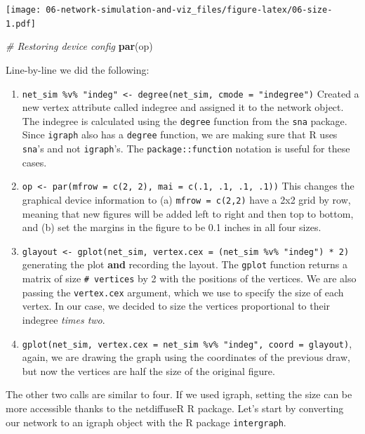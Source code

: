 \documentclass[]{book}
\newenvironment{Shaded}{\begin{snugshade}}{\end{snugshade}}
\newcommand{\CommentTok}[1]{\textcolor[rgb]{0.56,0.35,0.01}{\textit{#1}}}
\newcommand{\KeywordTok}[1]{\textcolor[rgb]{0.13,0.29,0.53}{\textbf{#1}}}
\newcommand{\NormalTok}[1]{#1}
\begin{document}
\texttt{[image: 06-network-simulation-and-viz\_files/figure-latex/06-size-1.pdf]}

\begin{Shaded}
\begin{Highlighting}[]
\CommentTok{# Restoring device config}
\KeywordTok{par}\NormalTok{(op)}
\end{Highlighting}
\end{Shaded}

Line-by-line we did the following:

\begin{enumerate}
\def\labelenumi{\arabic{enumi}.}
\item
  \texttt{net\_sim\ \%v\%\ "indeg"\ \textless{}-\ degree(net\_sim,\ cmode\ =\ "indegree")} Created a new
  vertex attribute called indegree and assigned it to the network object.
  The indegree is calculated using the \texttt{degree} function from the \texttt{sna}
  package. Since \texttt{igraph} also has a \texttt{degree} function, we are making sure
  that R uses \texttt{sna}'s and not \texttt{igraph}'s. The \texttt{package::function} notation
  is useful for these cases.
\item
  \texttt{op\ \textless{}-\ par(mfrow\ =\ c(2,\ 2),\ mai\ =\ c(.1,\ .1,\ .1,\ .1))} This changes the
  graphical device information to (a) \texttt{mfrow\ =\ c(2,2)} have a 2x2 grid by row,
  meaning that new figures will be added left to right and then top to bottom,
  and (b) set the margins in the figure to be 0.1 inches in all four sizes.
\item
  \texttt{glayout\ \textless{}-\ gplot(net\_sim,\ vertex.cex\ =\ (net\_sim\ \%v\%\ "indeg")\ *\ 2)} generating
  the plot \textbf{and} recording the layout. The \texttt{gplot} function returns a matrix of
  size \texttt{\#\ vertices} by 2 with the positions of the vertices. We are also passing the
  \texttt{vertex.cex} argument, which we use to specify the size of each vertex. In our
  case, we decided to size the vertices proportional to their indegree \emph{times two}.
\item
  \texttt{gplot(net\_sim,\ vertex.cex\ =\ net\_sim\ \%v\%\ "indeg",\ coord\ =\ glayout)}, again,
  we are drawing the graph using the coordinates of the previous draw, but now
  the vertices are half the size of the original figure.
\end{enumerate}

The other two calls are similar to four. If we used igraph, setting the
size can be more accessible thanks to the netdiffuseR R package. Let's start by converting
our network to an igraph object with the R package \texttt{intergraph}.
\end{document}
